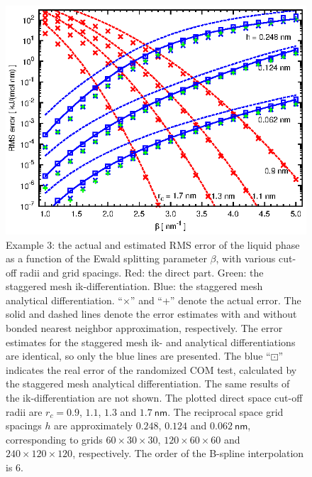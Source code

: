 \documentclass[journal=jacsat,manuscript=article]{achemso}
\begin{document}
\begin{figure}
  \centering
  \includegraphics[]{fig.mesh.st.eps}
  \caption{Example 3: the actual and estimated RMS error of the liquid
    phase as a function of the Ewald splitting parameter $\beta$,
    with various cut-off radii and grid spacings.
    Red: the direct part. Green: the staggered mesh ik-differentiation.
    Blue: the staggered mesh analytical differentiation. ``$\times$'' and
    ``+'' denote the actual error.  The solid and dashed lines denote
    the error estimates with and without bonded nearest neighbor
    approximation, respectively.
    The error estimates for the staggered mesh ik- and analytical
    differentiations are identical, so only the blue lines are presented.
    The blue ``$\boxdot$'' indicates the real error of the randomized COM test,
    calculated by the
    staggered mesh analytical differentiation. The same results
    of the ik-differentiation are not shown.
    The plotted direct space cut-off radii are
    $r_c = 0.9$, $1.1$, $1.3$ and  $1.7\:\textsf{nm}$. The
    reciprocal space grid spacings $h$  are approximately
    $0.248$, $0.124$ and $0.062\:\textsf{nm}$, corresponding to
    grids $60\times 30\times 30$, $120\times 60\times 60$ and
    $240\times 120\times 120$, respectively. The order of the B-spline
    interpolation is 6.
  }
  \label{fig:tmp-add3}
\end{figure}
\end{document}

